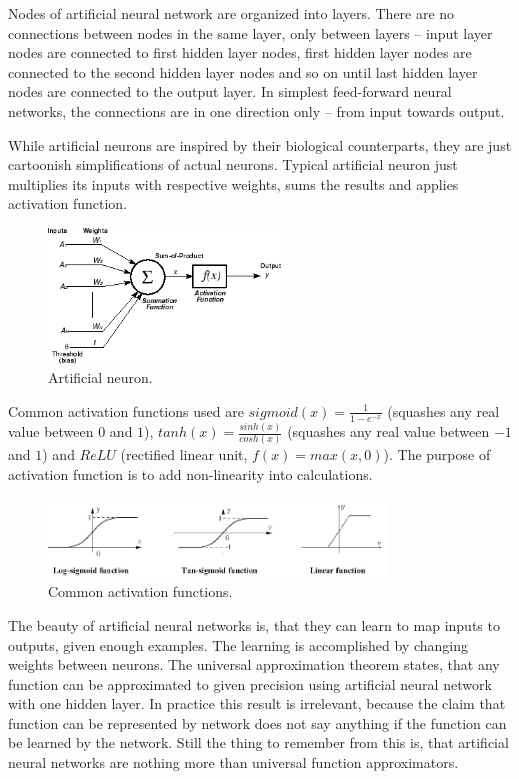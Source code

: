 \documentclass[a4paper,11pt]{article}
\begin{document}
Nodes of artificial neural network are organized into layers. There are no connections between nodes in the same layer, only between layers -- input layer nodes are connected to first hidden layer nodes, first hidden layer nodes are connected to the second hidden layer nodes and so on until last hidden layer nodes are connected to the output layer. In simplest feed-forward neural networks, the connections are in one direction only -- from input towards output.

While artificial neurons are inspired by their biological counterparts, they are just cartoonish simplifications of actual neurons. Typical artificial neuron just multiplies its inputs with respective weights, sums the results and applies activation function. 

\begin{figure}[h]
	\centering
	\includegraphics[width=0.55\textwidth]{neuron.png}
	\caption{Artificial neuron.}
\end{figure}

Common activation functions used are $sigmoid(x)=\frac{1}{1 - e^{-x}}$ (squashes any real value between $0$ and $1$), $tanh(x)=\frac{sinh(x)}{cosh(x)}$ (squashes any real value between $-1$ and $1$) and $ReLU$ (rectified linear unit, $f(x)=max(x, 0)$). The purpose of activation function is to add non-linearity into calculations.

\begin{figure}[h]
	\centering
	\includegraphics[width=0.8\textwidth]{activation_functions.png}
	\caption{Common activation functions.}
\end{figure}

\newpage

The beauty of artificial neural networks is, that they can learn to map inputs to outputs, given enough examples. The learning is accomplished by changing weights between neurons. The universal approximation theorem states, that any function can be approximated to given precision using artificial neural network with one hidden layer. In practice this result is irrelevant, because the claim that function can be represented by network does not say anything if the function can be learned by the network. Still the thing to remember from this is, that artificial neural networks are nothing more than universal function approximators.
\end{document}
